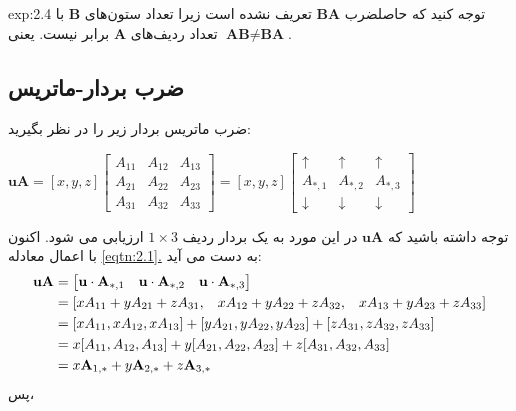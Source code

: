 {\begin{spacing}{1.5}
\begin{example}{exp:2.4}
            توجه کنید که حاصلضرب $\textbf{BA}$ تعریف نشده است زیرا تعداد ستون‌های $\textbf{B}$ با تعداد ردیف‌های $\textbf{A}$ برابر نیست. یعنی $\textbf{AB}\neq\textbf{BA}$.
        \end{example}

    \end{spacing}
}

\subsection{\textbf{ضرب بردار-ماتریس}}
{
    \Large
    \begin{spacing}{1.5}
        ضرب ماتریس بردار زیر را در نظر بگیرید:

        \begin{center}
            $\textbf{uA}=[x,y,z]\begin{bmatrix}
                                    A_{11} & A_{12} & A_{13} \\
                                    A_{21} & A_{22} & A_{23} \\
                                    A_{31} & A_{32} & A_{33}
            \end{bmatrix}=[x,y,z]\begin{bmatrix}
                                     \uparrow   & \uparrow   & \uparrow   \\
                                     A_{*,1}    & A_{*,2}    & A_{*,3}    \\
                                     \downarrow & \downarrow & \downarrow
            \end{bmatrix}$
        \end{center}

        توجه داشته باشید که $\textbf{uA}$ در این مورد به یک بردار ردیف $1\times 3$ ارزیابی می شود.
        اکنون با اعمال معادله \hyperref[eqtn:2.1]{\ref{eqtn:2.1}.} به دست می آید:
        \begin{equation*}
            \centering
            \begin{split}
                \textbf{uA}&=\begin{bmatrix}
                                 \textbf{u}\cdot\textbf{A}_{*,1} & \textbf{u}\cdot\textbf{A}_{*,2} & \textbf{u}\cdot\textbf{A}_{*,3}
                \end{bmatrix}\\
                &=[xA_{11}+yA_{21}+zA_{31},\hspace{3 mm} xA_{12}+yA_{22}+zA_{32},\hspace{3 mm} xA_{13}+yA_{23}+zA_{33}] \\
                &=[xA_{11},xA_{12},xA_{13}]+[yA_{21},yA_{22},yA_{23}]+[zA_{31},zA_{32},zA_{33}] \\
                &=x[A_{11},A_{12},A_{13}]+y[A_{21},A_{22},A_{23}]+z[A_{31},A_{32},A_{33}] \\
                &=x\textbf{A}_{1,*}+y\textbf{A}_{2,*}+z\textbf{A}_{3,*}
            \end{split}
        \end{equation*}
        پس،


\end{spacing}}
